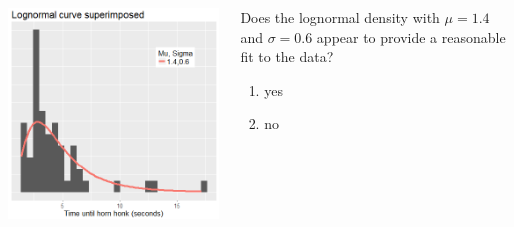 \begin{frame}
\frametitle{\grp}
\begin{columns}
\includegraphics[width=1.0\textwidth]{Figures/motorists_lognormal.png}
\begin{clicker}{Does the lognormal density with $\mu=1.4$ and $\sigma=0.6$ appear to provide a reasonable fit to the data?}
\begin{enumerate}
\item yes
\item no
\end{enumerate}
\end{clicker}
\end{columns}
\end{frame}


